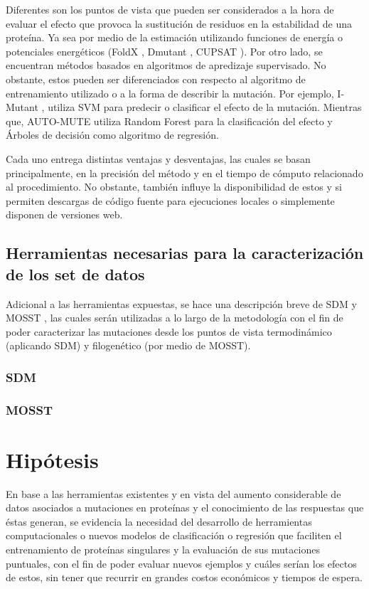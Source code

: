 Diferentes son los puntos de vista que pueden ser considerados a la hora de evaluar el efecto que provoca la sustitución de residuos en la estabilidad de una proteína. Ya sea por medio de la estimación utilizando funciones de energía o potenciales energéticos (FoldX \cite{Schymkowitz2005}, Dmutant \cite{Zhou2004}, CUPSAT \cite{Parthiban2006}). Por otro lado, se encuentran métodos basados en algoritmos de apredizaje supervisado. No obstante, estos pueden ser diferenciados con respecto al algoritmo de entrenamiento utilizado o a la forma de describir la mutación. Por ejemplo, I-Mutant \cite{Capriotti2005}, utiliza SVM para predecir o clasificar el efecto de la mutación. Mientras que, AUTO-MUTE \cite{Masso2010} utiliza Random Forest para la clasificación del efecto y Árboles de decisión como algoritmo de regresión.

Cada uno entrega distintas ventajas y desventajas, las cuales se basan principalmente, en la precisión del método y en el tiempo de cómputo relacionado al procedimiento. No obstante, también influye la disponibilidad de estos y si permiten descargas de código fuente para ejecuciones locales o simplemente disponen de versiones web. 


\subsection{Herramientas necesarias para la caracterización de los set de datos}

Adicional a las herramientas expuestas, se hace una descripción breve de SDM \cite{Pandurangan2017} y MOSST \cite{Olivera-Nappa2011}, las cuales serán utilizadas a lo largo de la metodología con el fin de poder caracterizar las mutaciones desde los puntos de vista termodinámico (aplicando SDM) y filogenético (por medio de MOSST).

\subsubsection{SDM}

\subsubsection{MOSST}

\section{Hipótesis}

En base a las herramientas existentes y en vista del aumento considerable de datos asociados a mutaciones en proteínas y el conocimiento de las respuestas que éstas generan, se evidencia la necesidad del desarrollo de herramientas computacionales o nuevos modelos de clasificación o regresión que faciliten el entrenamiento de proteínas singulares y la evaluación de sus mutaciones puntuales, con el fin de poder evaluar nuevos ejemplos y cuáles serían los efectos de estos, sin tener que recurrir en grandes costos económicos y tiempos de espera. 

